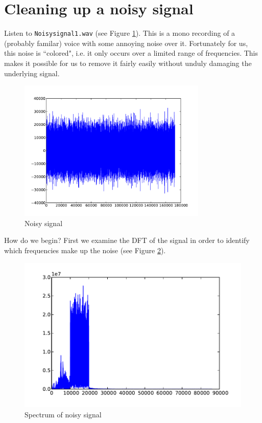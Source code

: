 
\section*{Cleaning up a noisy signal}

Listen to \texttt{Noisysignal1.wav} (see Figure \ref{noisysignal}). This is a mono recording of a (probably familar) voice with some annoying noise over it. Fortunately for us, this noise is ``colored", i.e. it only occurs over a limited range of frequencies. This makes it possible for us to remove it fairly easily without unduly damaging the underlying signal.
\begin{figure}[ht]\caption{Noisy signal}\label{noisysignal}\centering\includegraphics[width=90mm]{noisy}\end{figure}
How do we begin? First we examine the DFT of the signal in order to identify which frequencies make up the noise (see Figure \ref{noisyspec}).
\begin{figure}[ht]\caption{Spectrum of noisy signal}\label{noisyspec}\centering\includegraphics[width=\textwidth]{noisyspec}\end{figure}
